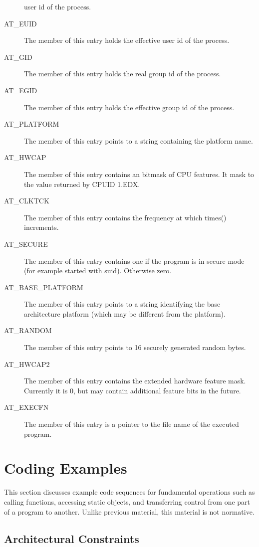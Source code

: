 \begin{description}
  user id of the process.
\item[AT_EUID] The  member of this entry holds the
  effective user id of the process.
\item[AT_GID] The  member of this entry holds the
  real group id of the process.
\item[AT_EGID] The  member of this entry holds the
  effective group id of the process.
\item[AT_PLATFORM] The  member of this entry points to
  a string containing the platform name.
\item[AT_HWCAP] The  member of this entry contains an bitmask
  of CPU features. It mask to the value returned by CPUID 1.EDX.
\item[AT_CLKTCK] The  member of this entry contains the
  frequency at which times() increments.
\item[AT_SECURE] The  member of this entry contains one
  if the program is in secure mode (for example started with suid).
  Otherwise zero.
\item[AT_BASE_PLATFORM] The  member of this entry points to
  a string identifying the base architecture platform (which may be different
  from the platform).
\item[AT_RANDOM] The  member of this entry points to 16 securely
  generated random bytes.
\item[AT_HWCAP2] The  member of this entry contains the extended
  hardware feature mask. Currently it is 0, but may contain additional feature
  bits in the future.
\item[AT_EXECFN] The  member of this entry is a pointer to the
  file name of the executed program.
\end{description}


\section{Coding Examples}
\label{sec_coding_examples}

This section discusses example code sequences for fundamental
operations such as calling functions, accessing static objects, and
transferring control from one part of a program to another.  Unlike
previous material, this material is not normative.

\subsection{Architectural Constraints\label{models}}

